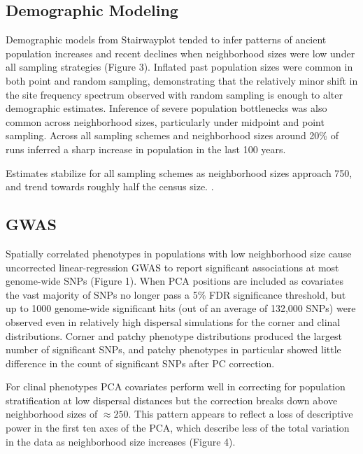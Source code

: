 \documentclass[9pt,twocolumn,twoside,lineno]{gsajnl}
\newif\ifcomments
\newcommand{\cjb}[1]{\ifcomments{{\color{blue} \it (#1)}}\else{}\fi}
\begin{document}
\subsection{Demographic Modeling}
Demographic models from Stairwayplot tended to infer patterns of ancient population increases and recent declines when neighborhood sizes were low under all sampling strategies (Figure 3). Inflated past population sizes were common in both point and random sampling, demonstrating that the relatively minor shift in the site frequency spectrum observed with random sampling is enough to alter demographic estimates. Inference of severe population bottlenecks was also common across neighborhood sizes, particularly under midpoint and point sampling. Across all sampling schemes and neighborhood sizes around 20\% of runs inferred a sharp increase in population in the last 100 years.

Estimates stabilize for all sampling schemes as neighborhood sizes approach 750, and trend towards roughly half the census size. 
\cjb{I still need to figure out what's going on with Ne here... pi is $\approx$ expected value for a WF population with $N\approx N_{c}/2$, but variance Ne is more like 1/5 census N. I thought it was closer to 1/2 earlier because of a bug in my script where I was dropping individuals who had 0 offspring. Working on it...}. 


\subsection{GWAS}
Spatially correlated phenotypes in populations with low neighborhood size cause uncorrected linear-regression GWAS to report significant associations at most genome-wide SNPs (Figure 1). When PCA positions are included as covariates the vast majority of SNPs no longer pass a 5\% FDR significance threshold, but up to 1000 genome-wide significant hits (out of an average of 132,000 SNPs) were observed even in relatively high dispersal simulations for the corner and clinal distributions. Corner and patchy phenotype distributions produced the largest number of significant SNPs, and patchy phenotypes in particular showed little difference in the count of significant SNPs after PC correction.

For clinal phenotypes PCA covariates perform well in correcting for population stratification at low dispersal distances but the correction breaks down above neighborhood sizes of $\approx250$. This pattern appears to reflect a loss of descriptive power in the first ten axes of the PCA, which describe less of the total variation in the data as neighborhood size increases (Figure 4). 
\end{document}
